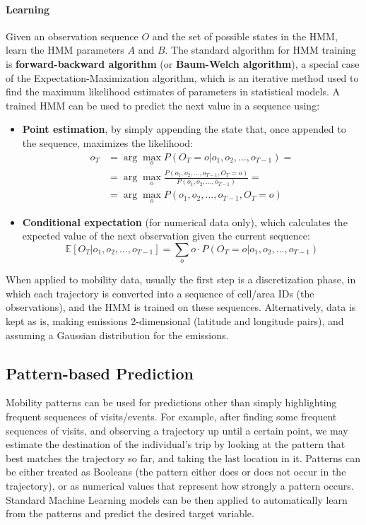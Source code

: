 \paragraph{Learning} Given an observation sequence $O$ and the set of possible states in the HMM, learn the HMM parameters $A$ and $B$. The standard algorithm for HMM training is \textbf{forward-backward algorithm} (or \textbf{Baum-Welch algorithm}), a special case of the Expectation-Maximization algorithm, which is an iterative method used to find the maximum likelihood estimates of parameters in statistical models. A trained HMM can be used to predict the next value in a sequence using:
\begin{itemize}
    \item \textbf{Point estimation}, by simply appending the state that, once appended to the sequence, maximizes the likelihood:
    \begin{align*}
        o_T &= \arg \max_o P(O_T = o | o_1, o_2, \dots, o_{T-1}) =\\
        &= \arg \max_o \frac{P(o_1, o_2, \dots, o_{T-1}, O_T = o)}{P(o_1, o_2, \dots, o_{T-1})} = \\
        &= \arg \max_o P(o_1, o_2, \dots, o_{T-1}, O_T = o)
    \end{align*}
    \item \textbf{Conditional expectation} (for numerical data only), which calculates the expected value of the next observation given the current sequence:
    \begin{equation*}
        \mathbb{E}[O_T|o_1, o_2, \dots, o_{T-1}] = \sum_o o \cdot P(O_T = o | o_1, o_2, \dots, o_{T-1}) 
    \end{equation*}
\end{itemize}
When applied to mobility data, usually the first step is a discretization phase, in which each trajectory is converted into a sequence of cell/area IDs (the observations), and the HMM is trained on these sequences. Alternatively, data is kept as is, making emissions 2-dimensional (latitude and longitude pairs), and assuming a Gaussian distribution for the emissions.

\subsection{Pattern-based Prediction}

Mobility patterns can be used for predictions other than simply highlighting frequent sequences of visits/events. For example, after finding some frequent sequences of visits, and observing a trajectory up until a certain point, we may estimate the destination of the individual's trip by looking at the pattern that best matches the trajectory so far, and taking the last location in it. Patterns can be either treated as Booleans (the pattern either does or does not occur in the trajectory), or as numerical values that represent how strongly a pattern occurs. Standard Machine Learning models can be then applied to automatically learn from the patterns and predict the desired target variable.

